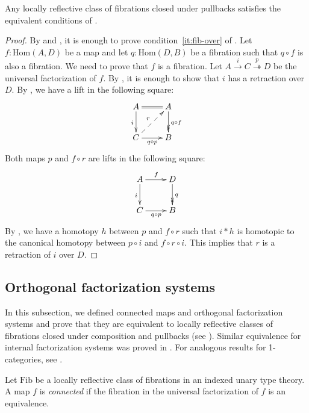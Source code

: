 \documentclass[reqno]{mscs}
\newcommand{\fs}[1]{\mathrm{#1}}
\newcommand{\Hom}{\fs{Hom}}
\newcommand{\Fib}{\fs{Fib}}
\numberwithin{figure}{section}
\begin{document}
\begin{prop}
Any locally reflective class of fibrations closed under pullbacks satisfies the equivalent conditions of .
\end{prop}
\begin{proof}
By  and , it is enough to prove condition~\eqref{it:fib-over} of .
Let $f : \Hom(A,D)$ be a map and let $q : \Hom(D,B)$ be a fibration such that $q \circ f$ is also a fibration.
We need to prove that $f$ is a fibration.
Let $A \xrightarrow{i} C \overset{p}\twoheadrightarrow D$ be the universal factorization of $f$.
By , it is enough to show that $i$ has a retraction over $D$.
By , we have a lift in the following square:
\[ \xymatrix{ A \ar@{=}[r] \ar[d]_i                 & A \ar@{->>}[d]^{q \circ f} \\
              C \ar[r]_{q \circ p} \ar@{-->}[ur]^r  & B
            } \]
Both maps $p$ and $f \circ r$ are lifts in the following square:
\[ \xymatrix{ A \ar[r]^f \ar[d]_i   & D \ar@{->>}[d]^q \\
              C \ar[r]_{q \circ p}  & B
            } \]
By , we have a homotopy $h$ between $p$ and $f \circ r$ such that $i * h$ is homotopic to the canonical homotopy between $p \circ i$ and $f \circ r \circ i$.
This implies that $r$ is a retraction of $i$ over $D$.
\end{proof}

\subsection{Orthogonal factorization systems}

In this subsection, we defined connected maps and orthogonal factorization systems and prove that they are equivalent to locally reflective classes of fibrations closed under composition and pullbacks (see ).
Similar equivalence for internal factorization systems was proved in \cite{modality-hott}.
For analogous results for 1-categories, see \cite[2.12]{cjkp-loc}.

\begin{defn}
Let $\Fib$ be a locally reflective class of fibrations in an indexed unary type theory.
A map $f$ is \emph{connected} if the fibration in the universal factorization of $f$ is an equivalence.
\end{defn}
\end{document}
